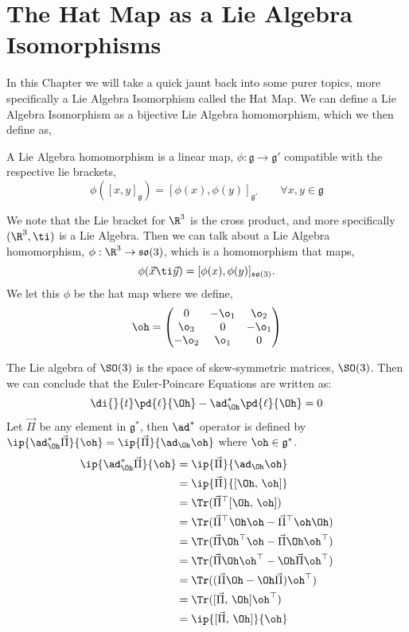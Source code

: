
\section{The Hat Map as a Lie Algebra Isomorphisms}
In this Chapter we will take a quick jaunt back into some purer topics, more specifically a Lie Algebra Isomorphism called the Hat Map. We can define a Lie Algebra Isomorphism as a bijective Lie Algebra homomorphism, which we then define as,
\begin{ndefi}
  A Lie Algebra homomorphism is a linear map, $\phi : \mathfrak{g} \to \mathfrak{g}'$ compatible with the respective lie brackets,
  $$ \phi([x, y]_\mathfrak{g}) = [\phi(x), \phi(y)]_{\mathfrak{g}'} \qquad \forall x, y \in \mathfrak{g} $$
\end{ndefi}

\noindent
We note that the Lie bracket for $\R^3$ is the cross product, and more specifically $(\R^3, \ti)$ is a Lie Algebra. Then we can talk about a Lie Algebra homomorphism, $\phi : \R^3 \to \mathfrak{so}(3)$, which is a homomorphism that maps,
$$ \phi(\vec x \ti \vec y) = [\phi (x), \phi (y)]_{\mathfrak{so}(3)}. $$
We let this $\phi$ be the hat map where we define,
$$ \oh = \begin{pmatrix}
  0 & -\o_1 & \o_2 \\ \o_3 & 0 & -\o_1 \\ -\o_2 & \o_1 & 0
\end{pmatrix} $$

\noindent
The Lie algebra of $\SO(3)$ is the space of skew-symmetric matrices, $\SO(3)$. Then we can conclude that the Euler-Poincare Equations are written as:
$$ \di {}{t} \pd{\ell}{\Oh} - \ad^*_{\Oh}\pd{\ell}{\Oh} = 0 $$
Let $\vec\Pi$ be any element in $\mathfrak{g}^*$, then $\ad^*$ operator is defined by $\ip{\ad_{\Oh}^*\vec\Pi}{\oh} = \ip{\vec\Pi}{\ad_{\Oh}{\oh}}$ where $\oh \in \mathfrak{g}^*$.
{\color{red} \begin{align*}
  \ip{\ad_{\Oh}^*\vec\Pi}{\oh} &= \ip{\vec\Pi}{\ad_{\Oh}{\oh}}\\
  &= \ip{\vec\Pi}{[\Oh,\,\oh]}\\
  &= \Tr(\vec\Pi^\top [\Oh,\,\oh])\\
  &= \Tr(\vec\Pi^\top \Oh\oh - \vec\Pi^\top\oh\Oh)\\
  &= \Tr(\vec\Pi\Oh^\top\oh - \vec\Pi\Oh\oh^\top)\\
  &= \Tr(\vec\Pi\Oh\oh^\top - \Oh\vec\Pi\oh^\top) \\
  &= \Tr((\vec\Pi\Oh - \Oh\vec\Pi)\oh^\top) \\
  &= \Tr([\vec\Pi,\,\Oh]\oh^\top) \\
  &= \ip{[\vec\Pi,\,\Oh]}{\oh}
\end{align*} }


